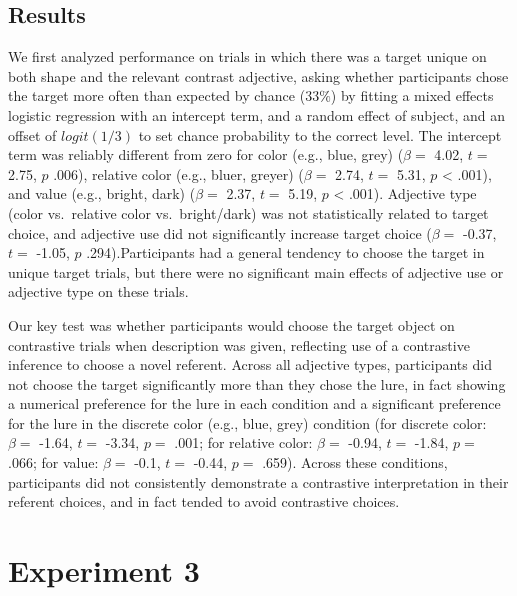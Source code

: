 \documentclass[10pt, letterpaper]{article}
\begin{document}
\subsection{Results}\label{results-1}

We first analyzed performance on trials in which there was a target
unique on both shape and the relevant contrast adjective, asking whether
participants chose the target more often than expected by chance
(\(33\%\)) by fitting a mixed effects logistic regression with an
intercept term, and a random effect of subject, and an offset of
\(logit(1/3)\) to set chance probability to the correct level. The
intercept term was reliably different from zero for color (e.g., blue,
grey) (\(\beta =\) 4.02, \(t =\) 2.75, \(p\) .006), relative color
(e.g., bluer, greyer) (\(\beta =\) 2.74, \(t =\) 5.31, \(p\) \textless{}
.001), and value (e.g., bright, dark) (\(\beta =\) 2.37, \(t =\) 5.19,
\(p\) \textless{} .001). Adjective type (color vs.~relative color
vs.~bright/dark) was not statistically related to target choice, and
adjective use did not significantly increase target choice (\(\beta =\)
-0.37, \(t =\) -1.05, \(p\) .294).Participants had a general tendency to
choose the target in unique target trials, but there were no significant
main effects of adjective use or adjective type on these trials.

Our key test was whether participants would choose the target object on
contrastive trials when description was given, reflecting use of a
contrastive inference to choose a novel referent. Across all adjective
types, participants did not choose the target significantly more than
they chose the lure, in fact showing a numerical preference for the lure
in each condition and a significant preference for the lure in the
discrete color (e.g., blue, grey) condition (for discrete color:
\(\beta =\) -1.64, \(t =\) -3.34, \(p =\) .001; for relative color:
\(\beta =\) -0.94, \(t =\) -1.84, \(p =\) .066; for value: \(\beta =\)
-0.1, \(t =\) -0.44, \(p =\) .659). Across these conditions,
participants did not consistently demonstrate a contrastive
interpretation in their referent choices, and in fact tended to avoid
contrastive choices.

\section{Experiment 3}\label{experiment-3}
\end{document}
